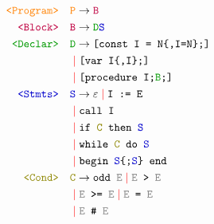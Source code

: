 \documentclass[a4paper]{article}
\begin{document}
\[
  \begin{aligned}
    \texttt{\color{orange}<Program>} \quad &\texttt{\color{orange}P\color{black}} \to
    \texttt{\color{purple}B} \\
    \texttt{\color{purple}<Block>} \quad &\texttt{\color{purple}B\color{black}} \to
    \texttt{\color{green!60!black}D\color{blue!80!black}S} \\
    \texttt{\color{green!60!black}<Declar>} \quad & \texttt{\color{green!60!black}D\color{black}} \to
    \texttt{[const I = N\{,I=N\};]} \\
                   & \color{red}\color{red}\mid\color{black}\color{black} \texttt{[var I\{,I\};]} \\
                   & \color{red}\color{red}\mid\color{black}\color{black} \texttt{[procedure I;\color{green!60!black}B\color{black};]} \\
    \texttt{\color{blue!80!black}<Stmts>} \quad & \texttt{\color{blue!80!black}S\color{black}} \to
    \varepsilon 
    \color{red}\color{red}\mid\color{black}\color{black} \texttt{I := E} \\
                   & \color{red}\color{red}\mid\color{black}\color{black} \texttt{call I} \\
                   & \color{red}\color{red}\mid\color{black}\color{black} \texttt{if \color{olive}C\color{black}\ then \color{blue!80!black}S\color{black}} \\
                   & \color{red}\color{red}\mid\color{black}\color{black} \texttt{while \color{olive}C\color{black}\ do \color{blue!80!black}S\color{black}} \\
                   & \color{red}\color{red}\mid\color{black}\color{black} \texttt{begin \color{blue!80!black}S\color{black}\{;\color{blue!80!black}S\color{black}\} end} \\
    \texttt{\color{olive}<Cond>} \quad & \texttt{\color{olive}C\color{black}} \to
    \texttt{odd \color{gray}E\color{black}} 
                    \color{red}\color{red}\mid\color{black}\color{black} \texttt{\color{gray}E\color{black}\ > \color{gray}E\color{black}} \\
                   & \color{red}\color{red}\mid\color{black}\color{black} \texttt{\color{gray}E\color{black}\ >= \color{gray}E\color{black}} 
                    \color{red}\color{red}\mid\color{black}\color{black} \texttt{\color{gray}E\color{black}\ = \color{gray}E\color{black}} \\
                   & \color{red}\color{red}\mid\color{black}\color{black} \texttt{\color{gray}E\color{black}\ \# \color{gray}E\color{black}} 

\end{aligned}\]
\end{document}
